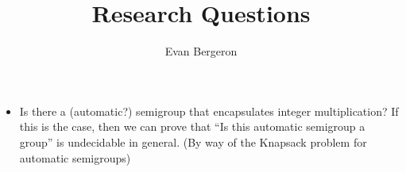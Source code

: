 \documentclass{article}
\title{Research Questions}
\author{Evan Bergeron}
\newcommand{\0}{\underline{0}}
\newcommand{\1}{\underline{1}}
\newcommand{\2}{\underline{2}}
\begin{document}
\maketitle
\begin{itemize}
\item Is there a (automatic?) semigroup that encapsulates integer multiplication? If this is the case, then we can prove that ``Is this automatic semigroup a group'' is undecidable in general. (By way of the Knapsack problem for automatic semigroups)
\end{itemize}
\end{document}
